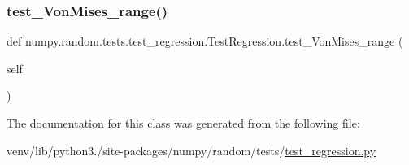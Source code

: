 \mbox{\label{classnumpy_1_1random_1_1tests_1_1test__regression_1_1TestRegression_a866b470dfc1dcb4fbe14f8875c4d4af9}} 
\subsubsection{\texorpdfstring{test\+\_\+\+Von\+Mises\+\_\+range()}{test\_VonMises\_range()}}
{\footnotesize\ttfamily def numpy.\+random.\+tests.\+test\+\_\+regression.\+Test\+Regression.\+test\+\_\+\+Von\+Mises\+\_\+range (\begin{DoxyParamCaption}\item[{}]{self }\end{DoxyParamCaption})}



The documentation for this class was generated from the following file\+:\begin{DoxyCompactItemize}
\item 
venv/lib/python3./site-\/packages/numpy/random/tests/\hyperlink{random_2tests_2test__regression_8py}{test\+\_\+regression.\+py}\end{DoxyCompactItemize}
